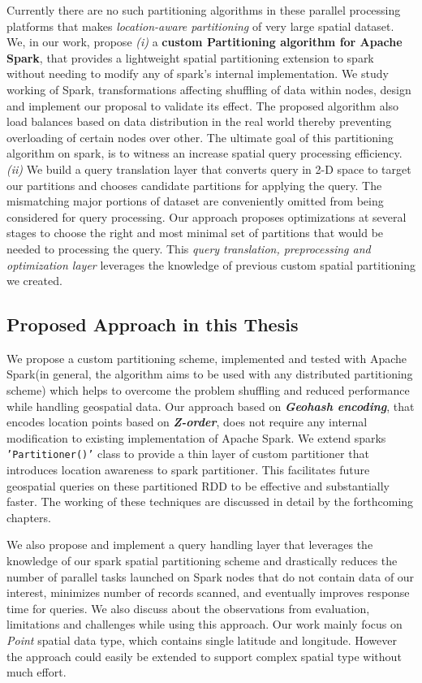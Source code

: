 \documentclass[article,type=msc,colorback,12pt,accentcolor=tud1d]{tudthesis}
\begin{document}
		Currently there are no such partitioning algorithms in these parallel processing platforms that makes \textit{location-aware partitioning} of very large spatial dataset. We, in our work,  propose \textit{(i)} a \textbf{custom Partitioning algorithm for Apache Spark}, that provides a lightweight spatial partitioning extension to spark without needing to modify any of spark's internal implementation. We study working of Spark, transformations affecting shuffling of data within nodes, design and implement our proposal to validate its effect. The proposed algorithm also load balances based on data distribution in the real world thereby preventing overloading of certain nodes over other. The ultimate goal of this partitioning algorithm on spark, is to witness an increase spatial query processing efficiency. \textit{(ii)} We build a query translation layer that converts query in 2-D space to target our partitions and chooses candidate partitions for applying the query. The mismatching major portions of dataset are conveniently omitted from being considered for query processing. Our approach proposes optimizations at several stages to choose the right and most minimal set of partitions that would be needed to processing the query. This \textit{query translation, preprocessing and optimization layer} leverages the knowledge of previous custom spatial partitioning we created.  
		
		\clearpage
		\subsection{Proposed Approach in this Thesis}
		\par We propose a custom partitioning scheme, implemented and tested with Apache Spark(in general, the algorithm aims to be used with any distributed partitioning scheme) which helps to overcome the problem shuffling and reduced performance while handling geospatial data. Our approach based on \textbf{\textit{Geohash encoding}}, that encodes location points based on \textbf{\textit{Z-order}}, does not require any internal modification to existing implementation of Apache Spark. We extend sparks \texttt{'Partitioner()'} class to provide a thin layer of custom partitioner that introduces location awareness to spark partitioner. This facilitates future geospatial queries on these partitioned RDD to be effective and substantially faster. The working of these techniques are discussed in detail by the forthcoming chapters.
		
		We also propose and implement a query handling layer that leverages the knowledge of our spark spatial partitioning scheme and drastically reduces the number of parallel tasks launched on Spark nodes that do not contain data of our interest, minimizes number of records scanned, and eventually improves response time for queries. We also discuss about the observations from evaluation, limitations and challenges while using this approach. Our work mainly focus on \textit{Point} spatial data type, which contains single latitude and longitude. However the approach could easily be extended to support complex spatial type without much effort.
		
\end{document}
